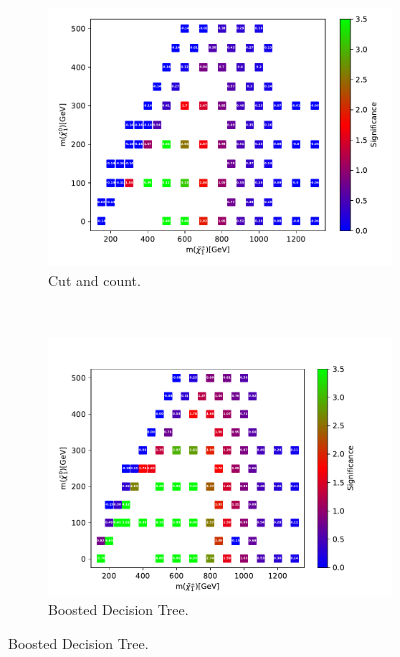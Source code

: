 \begin{figure}[H]
    \centering
    \begin{subfigure}[t!]{0.49\textwidth}
    \includegraphics[width = \textwidth]{Figures/Significances/significanceCutandCount_slepsnu_all.pdf}
    \caption{Cut and count.}
        \label{fig:signAllslepsnucandc}
    \end{subfigure}
    \\
    \begin{subfigure}[t!]{0.49\textwidth}
    \includegraphics[width = \textwidth]{Figures/Significances/significance_BDT_slepsnu_All_level.pdf}
    \caption{Boosted Decision Tree.}
        \label{fig:signAllslepsnuBDT}
    \end{subfigure}      

\end{figure}
